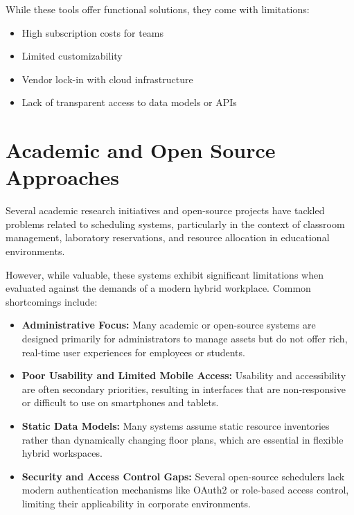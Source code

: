 \documentclass[12pt,a4paper]{report}
\begin{document}
While these tools offer functional solutions, they come with limitations:
\begin{itemize}
    \item High subscription costs for teams
    \item Limited customizability
    \item Vendor lock-in with cloud infrastructure
    \item Lack of transparent access to data models or APIs
\end{itemize}

\section{Academic and Open Source Approaches}

Several academic research initiatives and open-source projects have tackled problems related to scheduling systems, particularly in the context of classroom management, laboratory reservations, and resource allocation in educational environments.


However, while valuable, these systems exhibit significant limitations when evaluated against the demands of a modern hybrid workplace. Common shortcomings include:

\begin{itemize}
    \item \textbf{Administrative Focus:} Many academic or open-source systems are designed primarily for administrators to manage assets but do not offer rich, real-time user experiences for employees or students.
    \item \textbf{Poor Usability and Limited Mobile Access:} Usability and accessibility are often secondary priorities, resulting in interfaces that are non-responsive or difficult to use on smartphones and tablets.
    \item \textbf{Static Data Models:} Many systems assume static resource inventories rather than dynamically changing floor plans, which are essential in flexible hybrid workspaces.
    \item \textbf{Security and Access Control Gaps:} Several open-source schedulers lack modern authentication mechanisms like OAuth2 or role-based access control, limiting their applicability in corporate environments.
\end{itemize}
\end{document}
